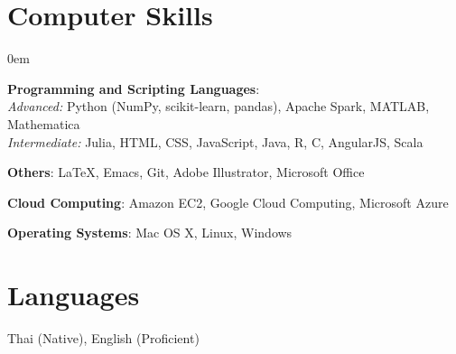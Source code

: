 \section{\sc Computer Skills}

\begin{itemize}[leftmargin=0cm, label={}]{
\itemsep0em
\item {\bf Programming and Scripting Languages}:\\
\textit{Advanced:} Python (\textsf{NumPy, scikit-learn, pandas}), Apache Spark, MATLAB, Mathematica\\
\textit{Intermediate:} \textsf{Julia}, \textsf{HTML}, \textsf{CSS}, \textsf{JavaScript}, \textsf{Java}, \textsf{R}, \textsf{C}, AngularJS, Scala
\item {\bf Others}: \LaTeX, \textsf{Emacs}, \textsf{Git}, Adobe Illustrator, Microsoft Office
\item {\bf Cloud Computing}: Amazon EC2, Google Cloud Computing, Microsoft Azure
\item {\bf Operating Systems}: Mac OS X, Linux, Windows}

\end{itemize}

\section{\sc Languages}
Thai (Native), English (Proficient)
